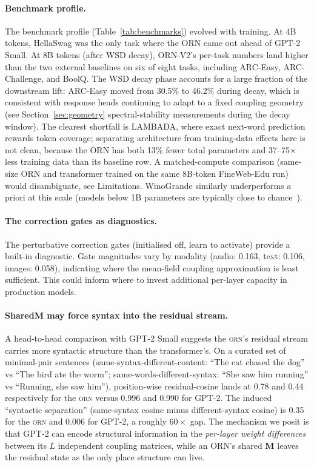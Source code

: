 \documentclass[10pt,twocolumn]{article}
\newcommand{\M}{\mathbf{M}}
\newcommand{\orn}{\textsc{orn}}
\begin{document}
\paragraph{Benchmark profile.}
The benchmark profile (Table~\ref{tab:benchmarks}) evolved with training.
At 4B tokens, HellaSwag was the only task where the ORN came out ahead of GPT-2 Small.
At 8B tokens (after WSD decay), ORN-V2's per-task numbers land higher than the two external baselines on six of eight tasks, including ARC-Easy, ARC-Challenge, and BoolQ.
The WSD decay phase accounts for a large fraction of the downstream lift: ARC-Easy moved from 30.5\% to 46.2\% during decay, which is consistent with response heads continuing to adapt to a fixed coupling geometry (see Section~\ref{sec:geometry} spectral-stability measurements during the decay window).
The clearest shortfall is LAMBADA, where exact next-word prediction rewards token coverage; separating architecture from training-data effects here is not clean, because the ORN has both 13\% fewer total parameters and 37--75$\times$ less training data than its baseline row. A matched-compute comparison (same-size ORN and transformer trained on the same 8B-token FineWeb-Edu run) would disambiguate, see Limitations. WinoGrande similarly underperforms a priori at this scale (models below 1B parameters are typically close to chance~\cite{sakaguchi2020winogrande}).

\paragraph{The correction gates as diagnostics.}
The perturbative correction gates (initialised off, learn to activate) provide a built-in diagnostic.
Gate magnitudes vary by modality (audio: 0.163, text: 0.106, images: 0.058), indicating where the mean-field coupling approximation is least sufficient.
This could inform where to invest additional per-layer capacity in production models.

\paragraph{SharedM may force syntax into the residual stream.}
A head-to-head comparison with GPT-2 Small suggests the \orn{}'s residual stream carries more syntactic structure than the transformer's.
On a curated set of minimal-pair sentences (same-syntax-different-content: ``The cat chased the dog'' vs ``The bird ate the worm''; same-words-different-syntax: ``She saw him running'' vs ``Running, she saw him''), position-wise residual-cosine lands at 0.78 and 0.44 respectively for the \orn{} versus 0.996 and 0.990 for GPT-2.
The induced ``syntactic separation'' (same-syntax cosine minus different-syntax cosine) is 0.35 for the \orn{} and 0.006 for GPT-2, a roughly $60\times$ gap.
The mechanism we posit is that GPT-2 can encode structural information in the \emph{per-layer weight differences} between its $L$ independent coupling matrices, while an ORN's shared $\M$ leaves the residual state as the only place structure can live.
\end{document}
